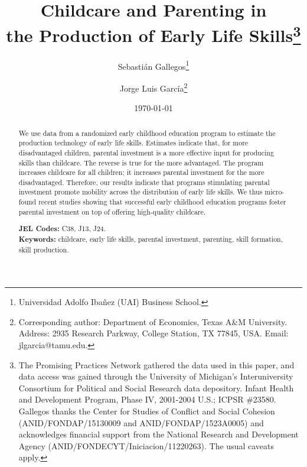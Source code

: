 


\title{\Large \textbf{Childcare and Parenting in \\ the Production of Early Life Skills}\thanks{The Promising Practices Network gathered the data used in this paper, and data access was gained through the University of Michigan's Interuniversity Consortium for Political and Social Research data depository. Infant Health and Development Program, Phase IV, 2001-2004 U.S.; ICPSR \#23580. Gallegos thanks the Center for Studies of Conflict and Social Cohesion (ANID/FONDAP/15130009 and ANID/FONDAP/1523A0005) and acknowledges financial support from the National Research and Development Agency (ANID/FONDECYT/Iniciacion/11220263). The usual caveats apply.}}

\author{Sebasti\'an Gallegos\thanks{Universidad Adolfo Ibañez (UAI) Business School.} \and Jorge Luis Garc\'{i}a\thanks{Corresponding author: Department of Economics, Texas A\&M University. Address: 2935 Research Parkway, College Station, TX 77845, USA. Email: jlgarcia@tamu.edu.}} 
\date{\today}

\maketitle
\thispagestyle{empty} 
\doublespacing
\thispagestyle{empty} 

\vspace{-10mm}
\renewcommand{\abstractname}{Abstract}
\begin{abstract} 
\normalsize 
\vspace{-5mm}

\noindent We use data from a randomized early childhood education program to estimate the production technology of early life skills. Estimates indicate that, for more disadvantaged children, parental investment is a more effective input for producing skills than childcare. The reverse is true for the more advantaged. The program increases childcare for all children; it increases parental investment for the more disadvantaged. Therefore, our results indicate that programs stimulating parental investment promote mobility across the distribution of early life skills. We thus micro-found recent studies showing that successful early childhood education programs foster parental investment on top of offering high-quality childcare.\\ 
\vspace{-5mm}

\onehalfspacing
\noindent \textbf{JEL Codes:} C38, J13, J24.\\
\noindent \textbf{Keywords:} childcare, early life skills, parental investment, parenting, skill formation, skill production. 
\end{abstract}


